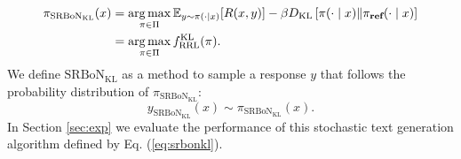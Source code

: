 \begin{equation}
\begin{aligned}
\pi_{\mathrm{SRBoN}_{\mathrm{KL}}}(x) 
&=\operatorname*{arg\,max}_{\pi \in \Pi}\mathbb{E}_{y \sim \pi(\cdot \mid x)}[R(x,y)]  - \beta D_{\mathrm{KL}} \left[\pi(\cdot \mid x) \| \pi_{\textbf{ref}}(\cdot \mid x)\right]\\
&= \operatorname*{arg\,max}_{\pi \in \Pi} f_\mathrm{RRL}^{\mathrm{KL}}(\pi).
\end{aligned}
\end{equation}
We define $\mathrm{SRBoN}_{\mathrm{KL}}$ as a method to sample a response $y$ that follows the probability distribution of $\pi_{\mathrm{SRBoN}_{\mathrm{KL}}}$:
\begin{equation}\label{eq:srbonkl}
    y_{\mathrm{SRBoN}_{\mathrm{KL}}}(x) \sim \pi_{\mathrm{SRBoN}_{\mathrm{KL}}}(x).
\end{equation}
In Section \ref{sec:exp} we evaluate the performance of this stochastic text generation algorithm defined by Eq. (\ref{eq:srbonkl}).

